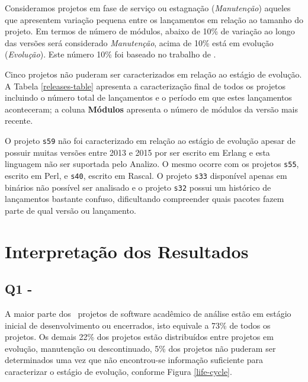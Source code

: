 Consideramos projetos em fase de serviço ou estagnação ({\it Manutenção}) aqueles que
apresentem variação pequena entre os lançamentos em relação ao tamanho do
projeto. Em termos de número de módulos, abaixo de 10\% de variação ao longo
das versões será considerado {\it Manutenção}, acima de 10\% está em evolução
({\it Evolução}). Este número 10\% foi baseado no trabalho de
.

Cinco projetos não puderam ser caracterizados em relação ao estágio de
evolução. A Tabela \ref{releases-table} apresenta a caracterização final de
todos os projetos incluindo o número total de lançamentos e o período em que
estes lançamentos aconteceram; a coluna {\bf Módulos} apresenta o número de
módulos da versão mais recente.



O projeto \texttt{s59} não foi caracterizado em relação ao estágio de evolução
apesar de possuir muitas versões entre 2013 e 2015 por ser escrito em Erlang e
esta linguagem não ser suportada pelo Analizo. O mesmo ocorre com os projetos
\texttt{s55}, escrito em Perl, e \texttt{s40}, escrito em Rascal. O projeto
\texttt{s33} disponível apenas em binários não possível ser analisado e o
projeto \texttt{s32} possui um histórico de lançamentos bastante confuso,
dificultando compreender quais pacotes fazem parte de qual versão ou
lançamento.


\section{Interpretação dos Resultados} \label{estudo3:interpretacao} %

\subsection{Q1 - \EstudoTresQuestaoUm}

A maior parte dos \SoftwareCount \ projetos de software acadêmico de análise estão
em estágio inicial de desenvolvimento ou encerrados, isto equivale a
73\% de todos os projetos. Os demais 22\% dos projetos estão distribuídos entre
projetos em evolução, manutenção ou descontinuado, 5\% dos projetos não puderam
ser determinados uma vez que não encontrou-se informação suficiente para
caracterizar o estágio de evolução,
conforme Figura \ref{life-cycle}.

